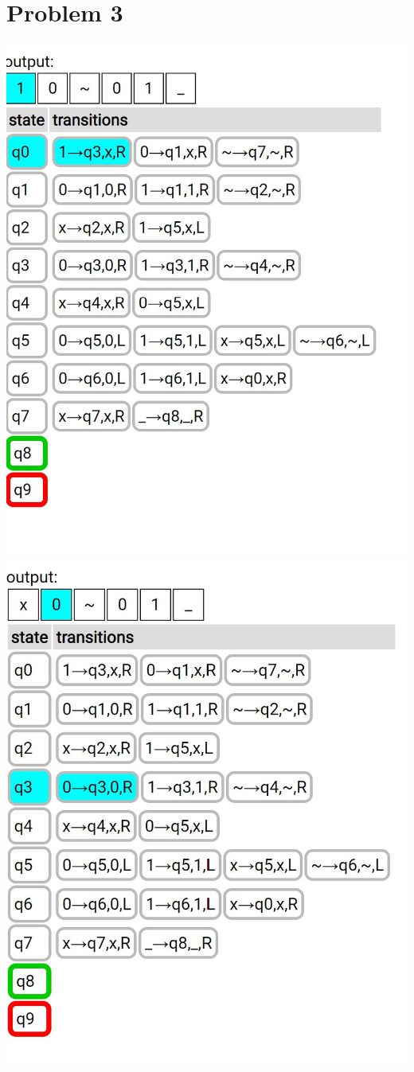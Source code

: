\documentclass{article}
\newenvironment{problem}[1]{
  \nobreak\section*{Problem #1}
}{}
\begin{document}
\begin{problem}{3}
\begin{center}
      \includegraphics[scale=0.5]{images/0.jpg}
      \includegraphics[scale=0.5]{images/1.jpg}

\end{center}
\end{problem}
\end{document}
